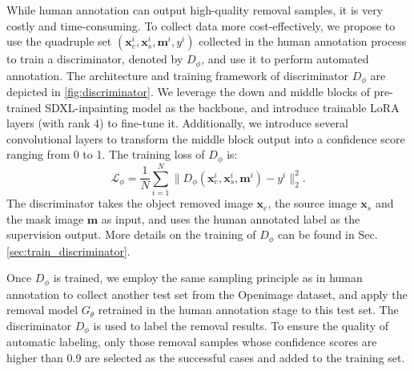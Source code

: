 \documentclass[10pt,twocolumn,letterpaper]{article}
\begin{document}
While human annotation can output high-quality removal samples, it is very costly and time-consuming. To collect data more cost-effectively, we propose to use the quadruple set ${(\mathbf{x}_e^i, \mathbf{x}_s^i, \mathbf{m}^i, y^i)}$ collected in the human annotation process to train a discriminator, denoted by $D_{\phi}$, and use it to perform automated annotation.
The architecture and training framework of discriminator $D_{\phi}$ are depicted in \cref{fig:discriminator}. We leverage the down and middle blocks of pre-trained SDXL-inpainting model \cite{podell2023sdxl} as the backbone, and introduce trainable LoRA \cite{hu2021lora} layers (with rank 4) to fine-tune it. Additionally, we introduce several convolutional layers to transform the middle block output into a confidence score ranging from 0 to 1. The training loss of $D_{\phi}$ is:
\begin{equation}
    \mathcal{L}_{\phi} = \frac{1}{N} \sum_{i=1}^{N}\| D_{\phi}(\mathbf{x}_e^i,\mathbf{x}_s^i,\mathbf{m}^i) - y^i \|_2^2.
    \label{eq:discriminator}
\end{equation}
The discriminator takes the object removed image $\mathbf{x}_e$, the source image $\mathbf{x}_s$ and the mask image $\mathbf{m}$ as input, and uses the human annotated label as the supervision output. More details on the training of $D_{\phi}$ can be found in Sec. \ref{sec:train_discriminator}.

Once $D_{\phi}$ is trained, we employ the same sampling principle as in human annotation to collect another test set from the Openimage dataset, and apply the removal model $G_{\theta}$ retrained in the human annotation stage to this test set. The discriminator $D_{\phi}$ is used to label the removal results. To ensure the quality of automatic labeling, only those removal samples whose confidence scores are higher than 0.9 are selected as the successful cases and added to the training set.  
\end{document}
